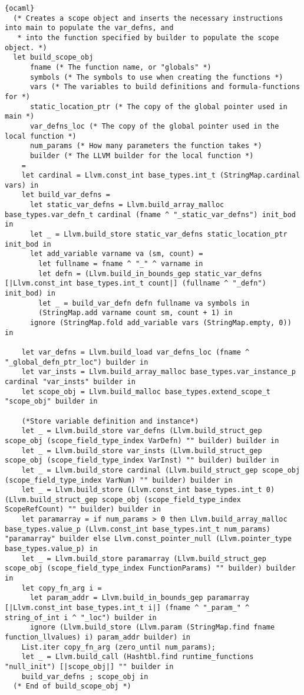 \begin{lstlisting}{ocaml}
  (* Creates a scope object and inserts the necessary instructions into main to populate the var_defns, and
   * into the function specified by builder to populate the scope object. *)
  let build_scope_obj
      fname (* The function name, or "globals" *)
      symbols (* The symbols to use when creating the functions *)
      vars (* The variables to build definitions and formula-functions for *)
      static_location_ptr (* The copy of the global pointer used in main *)
      var_defns_loc (* The copy of the global pointer used in the local function *)
      num_params (* How many parameters the function takes *)
      builder (* The LLVM builder for the local function *)
    =
    let cardinal = Llvm.const_int base_types.int_t (StringMap.cardinal vars) in
    let build_var_defns =
      let static_var_defns = Llvm.build_array_malloc base_types.var_defn_t cardinal (fname ^ "_static_var_defns") init_bod in
      let _ = Llvm.build_store static_var_defns static_location_ptr init_bod in
      let add_variable varname va (sm, count) =
        let fullname = fname ^ "_" ^ varname in
        let defn = (Llvm.build_in_bounds_gep static_var_defns [|Llvm.const_int base_types.int_t count|] (fullname ^ "_defn") init_bod) in
        let _ = build_var_defn defn fullname va symbols in
        (StringMap.add varname count sm, count + 1) in
      ignore (StringMap.fold add_variable vars (StringMap.empty, 0)) in

    let var_defns = Llvm.build_load var_defns_loc (fname ^ "_global_defn_ptr_loc") builder in
    let var_insts = Llvm.build_array_malloc base_types.var_instance_p cardinal "var_insts" builder in
    let scope_obj = Llvm.build_malloc base_types.extend_scope_t "scope_obj" builder in

    (*Store variable definition and instance*)
    let _ = Llvm.build_store var_defns (Llvm.build_struct_gep scope_obj (scope_field_type_index VarDefn) "" builder) builder in
    let _ = Llvm.build_store var_insts (Llvm.build_struct_gep scope_obj (scope_field_type_index VarInst) "" builder) builder in
    let _ = Llvm.build_store cardinal (Llvm.build_struct_gep scope_obj (scope_field_type_index VarNum) "" builder) builder in
    let _ = Llvm.build_store (Llvm.const_int base_types.int_t 0) (Llvm.build_struct_gep scope_obj (scope_field_type_index ScopeRefCount) "" builder) builder in
    let paramarray = if num_params > 0 then Llvm.build_array_malloc base_types.value_p (Llvm.const_int base_types.int_t num_params) "paramarray" builder else Llvm.const_pointer_null (Llvm.pointer_type base_types.value_p) in
    let _ = Llvm.build_store paramarray (Llvm.build_struct_gep scope_obj (scope_field_type_index FunctionParams) "" builder) builder in
    let copy_fn_arg i =
      let param_addr = Llvm.build_in_bounds_gep paramarray [|Llvm.const_int base_types.int_t i|] (fname ^ "_param_" ^ string_of_int i ^ "_loc") builder in
      ignore (Llvm.build_store (Llvm.param (StringMap.find fname function_llvalues) i) param_addr builder) in
    List.iter copy_fn_arg (zero_until num_params);
    let _ = Llvm.build_call (Hashtbl.find runtime_functions "null_init") [|scope_obj|] "" builder in
    build_var_defns ; scope_obj in
  (* End of build_scope_obj *)


\end{lstlisting}
